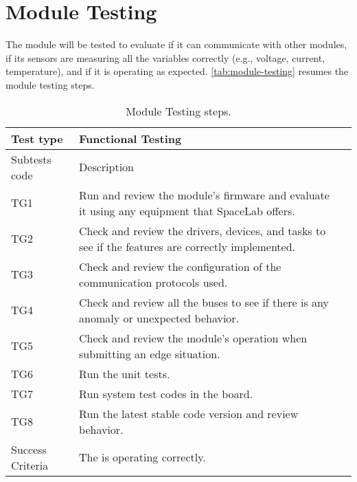 \section {Module Testing}

The module will be tested to evaluate if it can communicate with other modules, if its sensors are measuring all the variables correctly (e.g., voltage, current, temperature), and if it is operating as expected. \autoref{tab:module-testing} resumes the module testing steps.

\begin{table}[!htb]
\centering
\caption{Module Testing steps.}
\label{tab:module-testing}
\begin{tabular}{m{3cm} m{12cm} m{3cm}}
\toprule
Test type & Functional Testing \\
\midrule
\midrule
Subtests code & Description \\ 
\midrule
TG1 & Run and review the module's firmware and evaluate it using any equipment that SpaceLab offers. \\
\midrule
TG2 & Check and review the drivers, devices, and tasks to see if the features are correctly implemented. \\
\midrule
TG3 & Check and review the configuration of the communication protocols used. \\
\midrule
TG4 & Check and review all the buses to see if there is any anomaly or unexpected behavior. \\
\midrule
TG5 & Check and review the module's operation when submitting an edge situation. \\
\midrule
TG6 & Run the unit tests. \\
\midrule
TG7 & Run system test codes in the board. \\
\midrule
TG8 & Run the latest stable code version and review behavior. \\
\midrule
\midrule
Success Criteria & The is operating correctly. \\
\bottomrule
\end{tabular}
\end{table}
